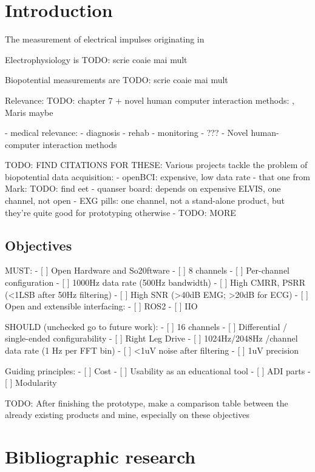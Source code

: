 \documentclass{thesis}
\newcommand{\todo}[1]{{\color{red}TODO: #1}}
\begin{document}

\maketableofcontents

\section{Introduction}

The measurement of electrical impulses originating in 

Electrophysiology is \todo{scrie coaie mai mult}




Biopotential measurements are \todo{scrie coaie mai mult}

Relevance: \todo{\cite{Barbero2012} chapter 7 + novel human computer interaction methods: \cite{Mller2020}, Maris maybe}

- medical relevance:
    - diagnosis
    - rehab
    - monitoring
    - ???
- Novel human-computer interaction methods

\todo{FIND CITATIONS FOR THESE:}
Various projects tackle the problem of biopotential data acquisition:
- openBCI: expensive, low data rate
- that one from Mark: \todo{find eet}
- quanser board: depends on expensive ELVIS, one channel, not open
- EXG pills: one channel, not a stand-alone product, but they're quite good for prototyping otherwise
- \todo{MORE}

\subsection{Objectives}

MUST:
- [ ] Open Hardware and So20ftware
- [ ] 8 channels
- [ ] Per-channel configuration
- [ ] 1000Hz data rate (500Hz bandwidth)
- [ ] High CMRR, PSRR (<1LSB after 50Hz filtering)
- [ ] High SNR (>40dB EMG; >20dB for ECG)
- [ ] Open and extensible interfacing:
    - [ ] ROS2
    - [ ] IIO

SHOULD (unchecked go to future work):
- [ ] 16 channels
- [ ] Differential / single-ended configurability
- [ ] Right Leg Drive
- [ ] 1024Hz/2048Hz /channel data rate (1 Hz per FFT bin)
- [ ] <1uV noise after filtering
- [ ] 1uV precision

Guiding principles:
- [ ] Cost
- [ ] Usability as an educational tool
- [ ] ADI parts
- [ ] Modularity

\todo{After finishing the prototype, make a comparison table between the already existing products and mine, especially on these objectives}

\newpage
\section{Bibliographic research}
\end{document}
